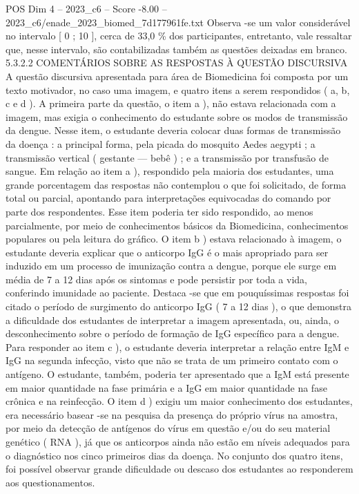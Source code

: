 \begin{textsample}{POS Dim 4 – 2023\_c6 – Score -8.00 – 2023\_c6/enade\_2023\_biomed\_7d177961fe.txt}
Observa -se um valor considerável no intervalo [ 0 ; 10 ], cerca de 33,0 \% dos participantes, entretanto, vale ressaltar que, nesse intervalo, são contabilizadas também as questões deixadas em branco. 5.3.2.2 COMENTÁRIOS SOBRE AS RESPOSTAS À QUESTÃO DISCURSIVA A questão discursiva apresentada para área de Biomedicina foi composta por um texto motivador, no caso uma imagem, e quatro itens a serem respondidos ( a, b, c e d ).
A primeira parte da questão, o item a ), não estava relacionada com a imagem, mas exigia o conhecimento do estudante sobre os modos de transmissão da dengue.
Nesse item, o estudante deveria colocar duas formas de transmissão da doença : a principal forma, pela picada do mosquito Aedes aegypti ; a transmissão vertical ( gestante — bebê ) ; e a transmissão por transfusão de sangue.
Em relação ao item a ), respondido pela maioria dos estudantes, uma grande porcentagem das respostas não contemplou o que foi solicitado, de forma total ou parcial, apontando para interpretações equivocadas do comando por parte dos respondentes.
Esse item poderia ter sido respondido, ao menos parcialmente, por meio de conhecimentos básicos da Biomedicina, conhecimentos populares ou pela leitura do gráfico.
O item b ) estava relacionado à imagem, o estudante deveria explicar que o anticorpo IgG é o mais apropriado para ser induzido em um processo de imunização contra a dengue, porque ele surge em média de 7 a 12 dias após os sintomas e pode persistir por toda a vida, conferindo imunidade ao paciente.
Destaca -se que em pouquíssimas respostas foi citado o período de surgimento do anticorpo IgG ( 7 a 12 dias ), o que demonstra a dificuldade dos estudantes de interpretar a imagem apresentada, ou, ainda, o desconhecimento sobre o período de formação de IgG específico para a dengue.
Para responder ao item c ), o estudante deveria interpretar a relação entre IgM e IgG na segunda infecção, visto que não se trata de um primeiro contato com o antígeno.
O estudante, também, poderia ter apresentado que a IgM está presente em maior quantidade na fase primária e a IgG em maior quantidade na fase crônica e na reinfecção.
O item d ) exigiu um maior conhecimento dos estudantes, era necessário basear -se na pesquisa da presença do próprio vírus na amostra, por meio da detecção de antígenos do vírus em questão e/ou do seu material genético ( RNA ), já que os anticorpos ainda não estão em níveis adequados para o diagnóstico nos cinco primeiros dias da doença.
No conjunto dos quatro itens, foi possível observar grande dificuldade ou descaso dos estudantes ao responderem aos questionamentos.

\end{textsample}
